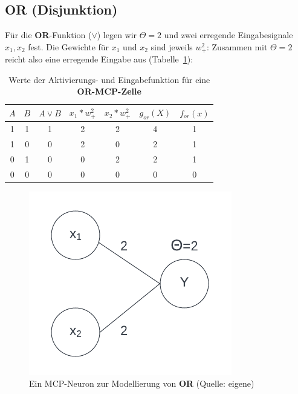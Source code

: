 {\subsection*{OR (Disjunktion)}

Für die \textbf{OR}-Funktion ($\lor$) legen wir $\Theta = 2$ und zwei erregende Eingabesignale $x_1, x_2$ fest. Die Gewichte für $x_1$ und $x_2$ sind jeweils $w^2_+$: Zusammen mit $\Theta = 2$ reicht also eine erregende Eingabe aus (Tabelle~\ref{tab:mcp-or}):


\begin{table} %
    \centering
    \begin{tabular}{c | c | c |c | c | c|c}
 $A$ & $B$ & $A \lor B$ & $x_1*w^2_+$ & $x_2*w^2_+$ & $g_{or}(X)$ & $f_{or}(x)$ \\
\hline
 1   & 1   & 1          & 2     & 2     & 4           & 1            \\
 1   & 0   & 0          & 2     & 0     & 2           & 1            \\
 0   & 1   & 0          & 0     & 2     & 2           & 1            \\
 0   & 0   & 0          & 0     & 0     & 0           & 0            \\
\end{tabular}
\caption{Werte der Aktivierungs- und Eingabefunktion für eine \textbf{OR-MCP-Zelle}}
\label{tab:mcp-or}
\end{table}


\begin{figure}[h]
    \centering
    \includegraphics{chapters/3. Kuenstliche Neuronen/mcpor}
    \caption{Ein MCP-Neuron zur Modellierung von \textbf{OR} (Quelle: eigene)}
    \label{fig:mcpor}
\end{figure}


}
